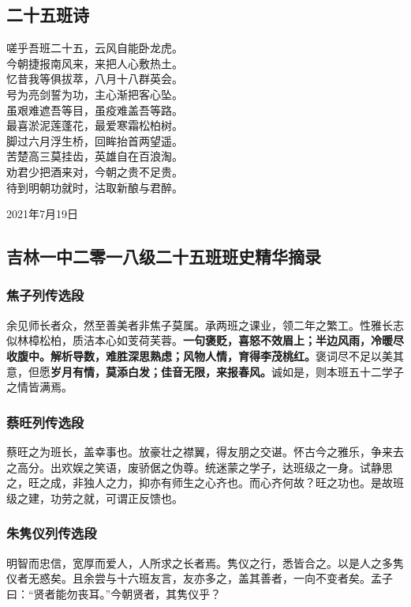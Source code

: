 \documentclass[a5paper]{ctexart}
\begin{document}
	\subsection{二十五班诗}
	\begin{center}
		嗟乎吾班二十五，云风自能卧龙虎。\\
		今朝捷报南风来，来把人心敷热土。\\
		忆昔我等俱拔萃，八月十八群英会。\\
		号为亮剑誓为功，主心渐把客心坠。\\
		虽艰难遮吾等目，虽疫难盖吾等路。\\
		最喜淤泥莲蓬花，最爱寒霜松柏树。\\
		脚过六月浮生桥，回眸抬首两望遥。\\
		苦楚高三莫挂齿，英雄自在百浪淘。\\
		劝君少把酒来对，今朝之贵不足贵。\\
		待到明朝功就时，沽取新酿与君醉。
		
	\end{center}
	\hfill 2021年7月19日
	
	\subsection{吉林一中二零一八级二十五班班史精华摘录}
	\subsubsection{焦子列传选段}
	余见师长者众，然至善美者非焦子莫属。承两班之课业，领二年之繁工。性雅长志似林樟松柏，质洁本心如芰荷芙蓉。\textbf{一句褒贬，喜怒不效眉上；半边风雨，冷暖尽收腹中。解析导数，难胜深思熟虑；风物人情，育得李茂桃红。}褒词尽不足以美其意，但愿\textbf{岁月有情，莫添白发；佳音无限，来报春风。}诚如是，则本班五十二学子之情皆满焉。
	
	\subsubsection{蔡旺列传选段}
	蔡旺之为班长，盖幸事也。放豪壮之襟翼，得友朋之交谌。怀古今之雅乐，争来去之高分。出欢娱之笑语，废骄倨之伪尊。统迷蒙之学子，达班级之一身。试静思之，旺之成，非独人之力，抑亦有师生之心齐也。而心齐何故？旺之功也。是故班级之建，功劳之就，可谓正反馈也。
	
	\subsubsection{朱隽仪列传选段}
	明智而忠信，宽厚而爱人，人所求之长者焉。隽仪之行，悉皆合之。以是人之多隽仪者无惑矣。且余尝与十六班友言，友亦多之，盖其善者，一向不变者矣。孟子曰：“贤者能勿丧耳。”今朝贤者，其隽仪乎？
	
\end{document}
